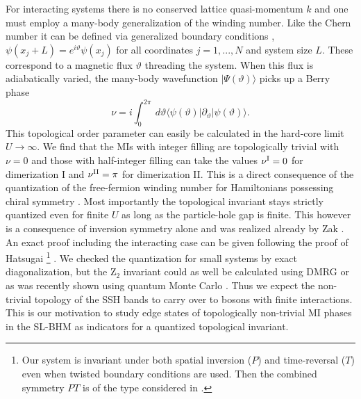 \documentclass[pra,aps,twocolumn,showpacs]{revtex4}
\newcommand{\bra}[1]{\left.\langle #1 \right|}
\newcommand{\ket}[1]{\left| #1 \right.\rangle}
\begin{document}
For interacting systems there is no conserved lattice quasi-momentum $k$ and one must employ a many-body generalization of 
the winding number. Like the Chern number \cite{Niu1985} it can be defined via generalized boundary conditions \cite{Resta1995},
$\psi(x_j+L)=e^{i \vartheta} \psi(x_j)$ for all
coordinates $j=1,...,N$ and system size $L$. These
correspond to a magnetic flux $\vartheta$ threading the system. When this flux is adiabatically varied, the many-body wavefunction 
$\ket{\Psi(\vartheta)}$ picks up a Berry phase \cite{Berry1984}
%
%
\begin{equation}
 \nu=i\int_0^{2\pi}\!\!\ d\vartheta \bra{\psi(\vartheta)} \partial_\vartheta \ket{\psi(\vartheta)}.
 \label{eq:ZakPhase}
\end{equation}
%
%
This topological order parameter can easily be calculated in the hard-core limit $U \to \infty$. 
We find that the MIs with integer filling are topologically trivial with $\nu=0$ and those with 
half-integer filling can take the values $\nu^{\rm I}=0$ for dimerization I and $\nu^{\rm II}=\pi$
for dimerization II. This is a direct consequence of the quantization of the free-fermion winding 
number for Hamiltonians possessing chiral symmetry \cite{Ryu2002,Ryu2010}. Most importantly the 
topological invariant stays strictly quantized even for finite $U$ as long as the particle-hole gap 
is finite. This however is a consequence of inversion symmetry alone and was realized already by Zak 
\cite{Zak1989}. An exact proof including the interacting case can be given 
following the proof of Hatsugai \cite{Hatsugai2006} \footnote{Our system is invariant under both 
spatial inversion ($P$) and time-reversal ($T$) even when twisted boundary conditions are used. Then the
combined symmetry $P T$ is of the type considered in \cite{Hatsugai2006}.}
. We checked the quantization for small systems by exact diagonalization, but the Z$_2$ 
invariant could as well be calculated using DMRG or as was recently shown using quantum Monte Carlo 
\cite{Motoyama2013}. Thus we expect the non-trivial topology of the SSH bands 
to carry over to bosons with finite interactions. This is our motivation to study 
edge states of topologically non-trivial
MI phases in the SL-BHM as indicators for a quantized topological invariant. 
\end{document}
